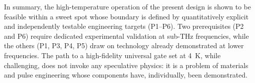 \medskip

In summary, the high-temperature operation of the present design is shown to be feasible
within a sweet spot whose boundary is defined by quantitatively explicit and
independently testable engineering targets (P1--P6). Two prerequisites (P2 and
P6) require dedicated experimental validation at sub-THz frequencies, while
the others (P1, P3, P4, P5) draw on technology already demonstrated at lower
frequencies. The path to a high-fidelity universal gate set at 4~K, while
challenging, does not invoke any speculative physics: it is a problem of
materials and pulse engineering whose components have, individually, been
demonstrated.

